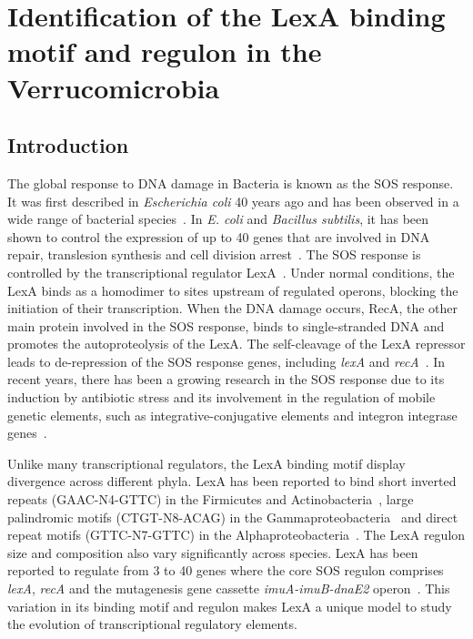 \chapter{Identification of the LexA binding motif and regulon in the
  Verrucomicrobia}

\section{Introduction}

The global response to DNA damage in Bacteria is known as the SOS response. It
was first described in \textit{Escherichia coli} 40 years ago and has been
observed in a wide range of bacterial species~\cite{radman1975sos,
  little1982sos, erill2007aeons}. In \textit{E. coli} and \textit{Bacillus
  subtilis}, it has been shown to control the expression of up to 40 genes that
are involved in DNA repair, translesion synthesis and cell division
arrest~\cite{au2005genetic, fernandez2000identification, walker2000sos}. The
SOS response is controlled by the transcriptional regulator
LexA~\cite{michel2005after}. Under normal conditions, the LexA binds as a
homodimer to sites upstream of regulated operons, blocking the initiation of
their transcription. When the DNA damage occurs, RecA, the other main protein
involved in the SOS response, binds to single-stranded DNA and promotes the
autoproteolysis of the LexA. The self-cleavage of the LexA repressor leads to
de-repression of the SOS response genes, including \textit{lexA} and
\textit{recA}~\cite{little1991mechanism}. In recent years, there has been a
growing research in the SOS response due to its induction by antibiotic stress
and its involvement in the regulation of mobile genetic elements, such as
integrative-conjugative elements and integron integrase genes~\cite{beaber2004sos,
  guerin2009sos}.

Unlike many transcriptional regulators, the LexA binding motif display
divergence across different phyla. LexA has been reported to bind short
inverted repeats (GAAC-N4-GTTC) in the Firmicutes and
Actinobacteria~\cite{au2005genetic, davis2002definition}, large palindromic
motifs (CTGT-N8-ACAG) in the Gammaproteobacteria~\cite{erill2003silico,
  fernandez2000identification} and direct repeat motifs (GTTC-N7-GTTC) in the
Alphaproteobacteria~\cite{erill2004differences,
  fernandez1998identification}. The LexA regulon size and composition also vary
significantly across species. LexA has been reported to regulate from 3 to 40
genes where the core SOS regulon comprises \textit{lexA}, \textit{recA} and the
mutagenesis gene cassette \textit{imuA-imuB-dnaE2}
operon~\cite{erill2006dispersal}. This variation in its binding motif and
regulon makes LexA a unique model to study the evolution of transcriptional
regulatory elements.

